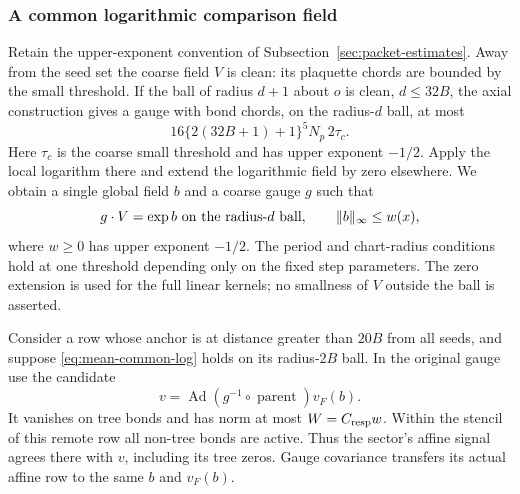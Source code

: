 \subsubsection{A common logarithmic comparison field}
Retain the upper-exponent convention of
Subsection~\ref{sec:packet-estimates}. Away from the seed set the
coarse field $V$ is clean: its plaquette chords are bounded by the
small threshold. If the ball of radius $d+1$ about $o$ is clean,
$d\le32B$, the axial construction gives a gauge with bond chords,
on the radius-$d$ ball, at most
\[
 16\{2(32B+1)+1\}^5N_p\,2\tau_c.
\]
Here $\tau_c$ is the coarse small threshold and has upper exponent
$-1/2$. Apply the local logarithm there and extend the logarithmic
field by zero elsewhere. We obtain a single global field $b$ and
a coarse gauge $g$ such that
\begin{equation}\label{eq:mean-common-log}
 g\cdot V=\exp b\ \hbox{on the radius-$d$ ball},\qquad
 \|b\|_\infty\le w(x),
\end{equation}
where $w\ge0$ has upper exponent $-1/2$. The period and chart-radius
conditions hold at one threshold depending only on the fixed step
parameters. The zero extension is used for the full linear kernels;
no smallness of $V$ outside the ball is asserted.

Consider a row whose anchor is at distance greater than $20B$ from
all seeds, and suppose \eqref{eq:mean-common-log} holds on its
radius-$2B$ ball. In the original gauge use the candidate
\[
 v=\operatorname{Ad}(g^{-1}\circ\operatorname{parent})v_F(b).
\]
It vanishes on tree bonds and has norm at most
$W=C_{\rm resp}w$. Within the stencil of this remote row all non-tree
bonds are active. Thus the sector's affine signal agrees there with
$v$, including its tree zeros. Gauge covariance transfers its actual
affine row to the same $b$ and $v_F(b)$.

